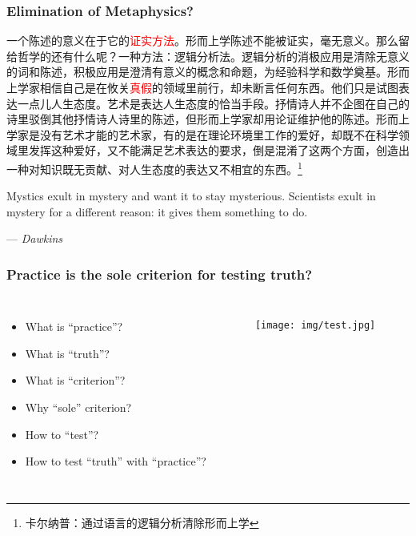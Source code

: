\documentclass[UTF8,11pt,colorlinks,compress,openany]{beamer}%
\begin{document}
\begin{frame}\frametitle{Elimination of Metaphysics?}
	\begin{block}{}\small
		一个陈述的意义在于它的\textcolor{red}{证实方法}。形而上学陈述不能被证实，毫无意义。那么留给哲学的还有什么呢？一种方法：逻辑分析法。逻辑分析的消极应用是清除无意义的词和陈述，积极应用是澄清有意义的概念和命题，为经验科学和数学奠基。形而上学家相信自己是在攸关\textcolor{red}{真假}的领域里前行，却未断言任何东西。他们只是试图表达一点儿人生态度。艺术是表达人生态度的恰当手段。抒情诗人并不企图在自己的诗里驳倒其他抒情诗人诗里的陈述，但形而上学家却用论证维护他的陈述。形而上学家是没有艺术才能的艺术家，有的是在理论环境里工作的爱好，却既不在科学领域里发挥这种爱好，又不能满足艺术表达的要求，倒是混淆了这两个方面，创造出一种对知识既无贡献、对人生态度的表达又不相宜的东西。\footnote{卡尔纳普：通过语言的逻辑分析清除形而上学}
	\end{block}
			Mystics exult in mystery and want it to stay mysterious. Scientists exult in mystery for a different reason: it gives them something to do.\par
			\hfill --- \textsl{Dawkins}
\end{frame}

\begin{frame}\frametitle{Practice is the sole criterion for testing truth?}
\centering{}
	\begin{columns}[onlytextwidth]
				\begin{itemize}
					\item What is ``practice''?
					\item What is ``truth''?
					\item What is ``criterion''?
					\item Why ``sole'' criterion?
					\item How to ``test''?
					\item How to test ``truth'' with ``practice''?
				\end{itemize}
			\begin{figure}
				\texttt{[image: img/test.jpg]}
			\end{figure}
	\end{columns}
\end{frame}
\end{document}
